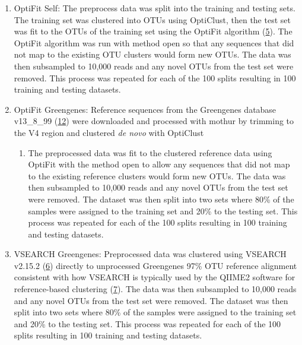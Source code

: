 \documentclass[
]{article}
\providecommand{\tightlist}{%
  \setlength{\itemsep}{0pt}\setlength{\parskip}{0pt}}
\begin{document}
\begin{enumerate}
\def\labelenumi{\arabic{enumi}.}
\tightlist
\item
  OptiFit Self: The preprocess data was split into the training and
  testing sets. The training set was clustered into OTUs using
  OptiClust, then the test set was fit to the OTUs of the training set
  using the OptiFit algorithm (\protect\hyperlink{ref-sovacool2022}{5}).
  The OptiFit algorithm was run with method open so that any sequences
  that did not map to the existing OTU clusters would form new OTUs. The
  data was then subsampled to 10,000 reads and any novel OTUs from the
  test set were removed. This process was repeated for each of the 100
  splits resulting in 100 training and testing datasets.
\item
  OptiFit Greengenes: Reference sequences from the Greengenes database
  v13\_8\_99 (\protect\hyperlink{ref-desantis2006}{12}) were downloaded
  and processed with mothur by trimming to the V4 region and clustered
  \emph{de novo} with OptiClust

  \begin{enumerate}
  \def\labelenumii{\arabic{enumii}.}
  \tightlist
  \item
    The preprocessed data was fit to the clustered reference data using
    OptiFit with the method open to allow any sequences that did not map
    to the existing reference clusters would form new OTUs. The data was
    then subsampled to 10,000 reads and any novel OTUs from the test set
    were removed. The dataset was then split into two sets where 80\% of
    the samples were assigned to the training set and 20\% to the
    testing set. This process was repeated for each of the 100 splits
    resulting in 100 training and testing datasets.
  \end{enumerate}
\item
  VSEARCH Greengenes: Preprocessed data was clustered using VSEARCH
  v2.15.2 (\protect\hyperlink{ref-rognes2016}{6}) directly to
  unprocessed Greengenes 97\% OTU reference alignment consistent with
  how VSEARCH is typically used by the QIIME2 software for
  reference-based clustering (\protect\hyperlink{ref-bolyen2019}{7}).
  The data was then subsampled to 10,000 reads and any novel OTUs from
  the test set were removed. The dataset was then split into two sets
  where 80\% of the samples were assigned to the training set and 20\%
  to the testing set. This process was repeated for each of the 100
  splits resulting in 100 training and testing datasets.
\end{enumerate}
\end{document}
